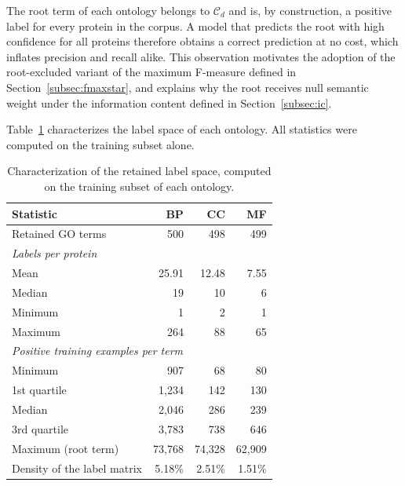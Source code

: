 \documentclass[Ingles]{ic-tese-v3}
\begin{document}
The root term of each ontology belongs to $\mathcal{C}_d$ and is, by
construction, a positive label for every protein in the corpus. A model that
predicts the root with high confidence for all proteins therefore obtains a
correct prediction at no cost, which inflates precision and recall alike. This
observation motivates the adoption of the root-excluded variant of the maximum
F-measure defined in Section~\ref{subsec:fmaxstar}, and explains why the root
receives null semantic weight under the information content defined in
Section~\ref{subsec:ic}.

Table~\ref{tab:rotulos} characterizes the label space of each ontology. All
statistics were computed on the training subset alone.

\begin{table}[!htb]
    \centering
    \caption{Characterization of the retained label space, computed on the
    training subset of each ontology.}
    \label{tab:rotulos}
    \begin{tabular}{lrrr}
    \toprule
    Statistic & BP & CC & MF \\
    \midrule
    Retained GO terms                       & 500    & 498    & 499    \\
    \midrule
    \multicolumn{4}{l}{\emph{Labels per protein}} \\
    \quad Mean                              & 25.91  & 12.48  & 7.55   \\
    \quad Median                            & 19     & 10     & 6      \\
    \quad Minimum                           & 1      & 2      & 1      \\
    \quad Maximum                           & 264    & 88     & 65     \\
    \midrule
    \multicolumn{4}{l}{\emph{Positive training examples per term}} \\
    \quad Minimum                           & 907    & 68     & 80     \\
    \quad 1st quartile                      & 1,234  & 142    & 130    \\
    \quad Median                            & 2,046  & 286    & 239    \\
    \quad 3rd quartile                      & 3,783  & 738    & 646    \\
    \quad Maximum (root term)               & 73,768 & 74,328 & 62,909 \\
    \midrule
    Density of the label matrix             & 5.18\% & 2.51\% & 1.51\% \\
    \bottomrule
    \end{tabular}
\end{table}
\end{document}
